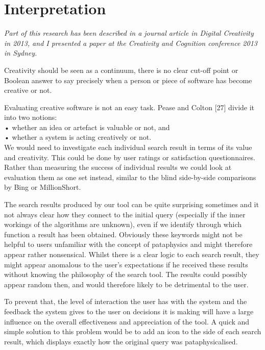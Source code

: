 
\chapter{Interpretation}
\label{ch:interpretation}

\emph{Part of this research has been described in a journal article in Digital Creativity in 2013, and I presented a paper at the Creativity and Cognition conference 2013 in Sydney.}

\grule{}

\begin{draft}
  Creativity should be seen as a continuum, there is no clear cut-off point or Boolean answer to say precisely when a person or piece of software has become creative or not.
\end{draft}

Evaluating creative software is not an easy task. Pease and Colton [27] divide it into two notions: \\
•	whether an idea or artefact is valuable or not, and\\
•	whether a system is acting creatively or not.\\

We would need to investigate each individual search result in terms of its value and creativity. This could be done by user ratings or satisfaction questionnaires. Rather than measuring the success of individual results we could look at evaluation them as one set instead, similar to the blind side-by-side comparisons by Bing or MillionShort.

The search results produced by our tool can be quite surprising sometimes and it not always clear how they connect to the initial query (especially if the inner workings of the algorithms are unknown), even if we identify through which function a result has been obtained. Obviously these keywords might not be helpful to users unfamiliar with the concept of pataphysics and might therefore appear rather nonsensical. Whilst there is a clear logic to each search result, they might appear anomalous to the user’s expectations if he received these results without knowing the philosophy of the search tool. The results could possibly appear random then, and would therefore likely to be detrimental to the user.

To prevent that, the level of interaction the user has with the system and the feedback the system gives to the user on decisions it is making will have a large influence on the overall effectiveness and appreciation of the tool. A quick and simple solution to this problem would be to add an icon to the side of each search result, which displays exactly how the original query was pataphysicalised.

